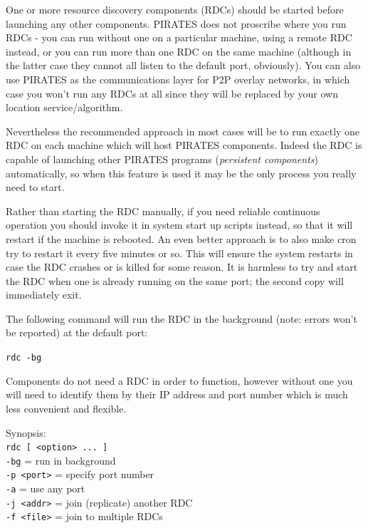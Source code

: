 \documentclass[12pt,a4paper,twoside]{article}
\renewcommand{\_}{\texttt{\symbol{95}}}
\begin{document}
One or more resource discovery components (RDCs) should be started before
launching any other components. PIRATES does not proscribe where you
run RDCs - you can run without one on a particular machine,
using a remote RDC instead, or you can run more than one RDC on
the same machine (although in the latter case they cannot all
listen to the default port, obviously). You can also use PIRATES as the
communications layer for P2P overlay networks, in which case you won't
run any RDCs at all since they will be replaced by your own
location service/algorithm.

Nevertheless the recommended approach in most cases will be to run exactly
one RDC on each machine which will host PIRATES components.
Indeed the RDC is capable of launching other PIRATES programs
(\textit{persistent components}) automatically, so when this feature is
used it may be the only process you really need to start.

Rather than starting the RDC manually, if you need reliable continuous
operation you should invoke it in system start up scripts instead, so
that it will restart if the machine is rebooted. An even better
approach is to also make cron try to restart it every five minutes or so.
This will ensure the system restarts in case the RDC crashes or is
killed for some reason. It is harmless to try and start the RDC when
one is already running on the same port; the second copy will
immediately exit.

The following command will run the RDC in the background (note: errors won't be
reported) at the default port:

\verb^rdc -bg^

Components do not need a RDC in order to function, however without
one you will need to identify them by their IP address and port number
which is much less convenient and flexible.

Synopsis:\\
\verb^rdc [ <option> ... ]^\\
\hspace*{15mm}\verb^-bg^ = run in background\\
\hspace*{15mm}\verb^-p <port>^ = specify port number\\
\hspace*{15mm}\verb^-a^ = use any port\\
\hspace*{15mm}\verb^-j <addr>^ = join (replicate) another RDC\\
\hspace*{15mm}\verb^-f <file>^ = join to multiple RDCs\\
\end{document}
